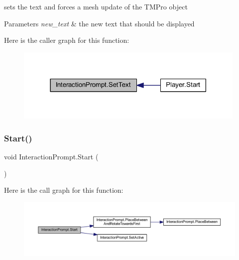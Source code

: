 sets the text and forces a mesh update of the T\+M\+Pro object 


\begin{DoxyParams}{Parameters}
{\em new\+\_\+text} & the new text that should be displayed\\
\hline
\end{DoxyParams}
Here is the caller graph for this function\+:\nopagebreak
\begin{figure}[H]
\begin{center}
\leavevmode
\includegraphics[width=314pt]{class_interaction_prompt_ac68329e8bcb18bc4556695f506d5b410_icgraph}
\end{center}
\end{figure}
\mbox{\label{class_interaction_prompt_ada65c2aa759ea18aa2ccf6ba8cd3843b}} 
\subsubsection{\texorpdfstring{Start()}{Start()}}
{\footnotesize\ttfamily void Interaction\+Prompt.\+Start (\begin{DoxyParamCaption}{ }\end{DoxyParamCaption})\hspace{0.3cm}{\ttfamily [private]}}

Here is the call graph for this function\+:\nopagebreak
\begin{figure}[H]
\begin{center}
\leavevmode
\includegraphics[width=350pt]{class_interaction_prompt_ada65c2aa759ea18aa2ccf6ba8cd3843b_cgraph}
\end{center}
\end{figure}



